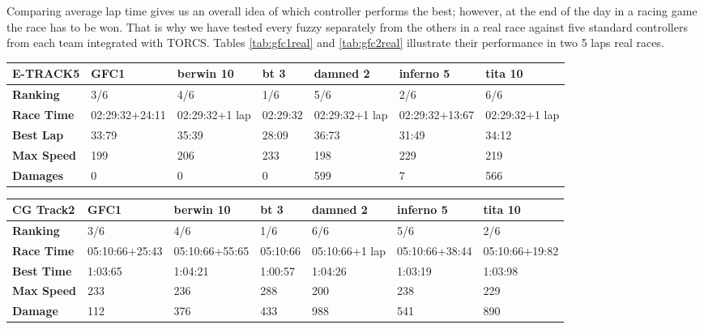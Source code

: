 \documentclass[conference]{IEEEtran}
\begin{document}
Comparing average lap time gives us an overall idea of which
controller performs the best; however, at the end of the day in a
racing game the race has to be won. That is why we have tested every
fuzzy separately from the others in a real race against five standard controllers from each team integrated with TORCS. Tables \ref{tab:gfc1real} and \ref{tab:gfc2real}   illustrate their performance in two 5 laps real races. 
\begin{table*}[!ht]
	\centering
	{\scriptsize
		\caption{Results of GFC1 in two real races (5 laps)}
		\label{tab:gfc1real}
		\begin{tabular}{|p{2 cm}|p{1.5 cm}|p{1.5 cm}|p{1.5 cm}|p{1.5 cm}|p{1.5 cm}|p{1.5 cm}|}
			\hline \textbf{E-TRACK5} &   \textbf{GFC1} & \textbf{berwin 10} & \textbf{bt 3} &\textbf{damned 2} & \textbf{inferno 5} & \textbf{tita 10}  \\
			\hline \textbf{Ranking} & 3/6&4/6&1/6&5/6&2/6&6/6\\			
			\hline \textbf{Race Time}	& 02:29:32\newline+24:11&02:29:32\newline +1 lap &02:29:32&02:29:32\newline +1 lap &02:29:32\newline+13:67&02:29:32\newline+1 lap\\	
			\hline \textbf{Best Lap}&33:79& 35:39&28:09&36:73&31:49&34:12\\	
			\hline \textbf{Max Speed}& 199&206&233&198&229&219\\	
			\hline \textbf{Damages}& 0&0&0&599&7&566 \\	
			\hline 
		\end{tabular}
		
		\begin{tabular}{|p{2 cm}|p{1.5 cm}|p{1.5 cm}|p{1.5 cm}|p{1.5 cm}|p{1.5 cm}|p{1.5 cm}|}
			\hline \textbf{CG Track2} & \textbf{GFC1}&\textbf{berwin 10} & \textbf{bt 3} &\textbf{damned 2} & \textbf{inferno 5} & \textbf{tita 10}  \\
			\hline \textbf{Ranking} & 3/6&4/6&1/6&6/6&5/6&2/6\\			
			\hline \textbf{Race Time}	&  05:10:66\newline +25:43&  05:10:66\newline+55:65& 05:10:66& 05:10:66\newline+1 lap& 05:10:66\newline+38:44& 05:10:66\newline+19:82\\	
			\hline \textbf{Best Time}& 1:03:65 &1:04:21&1:00:57&1:04:26&1:03:19&1:03:98\\	
			\hline \textbf{Max Speed}& 233&236&288&200&238&229\\
			\hline \textbf{Damage}& 112& 376 & 433&988&541&890\\	
			\hline 
		\end{tabular}
	}
\end{table*}
\end{document}
